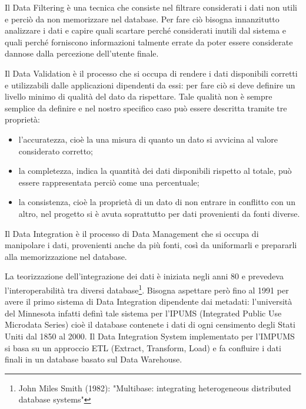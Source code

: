 \documentclass[12pt]{report}
\begin{document}
Il Data Filtering è una tecnica che consiste nel filtrare considerati i dati non utili e perciò da non memorizzare nel database.
Per fare ciò bisogna innanzitutto analizzare i dati e capire quali scartare perché considerati inutili dal sistema e quali perché forniscono informazioni talmente errate da poter essere considerate dannose dalla percezione dell'utente finale.

Il Data Validation è il processo che si occupa di rendere i dati disponibili corretti e utilizzabili dalle applicazioni dipendenti da essi: per fare ciò si deve definire un livello minimo di qualità del dato da rispettare. 
Tale qualità non è sempre semplice da definire e nel nostro specifico caso può essere descritta tramite tre proprietà:
\begin{itemize}
\item l'accuratezza, cioè la una misura di quanto un dato si avvicina al valore considerato corretto;
\item la completezza, indica la quantità dei dati disponibili rispetto al totale, può essere rappresentata perciò come una percentuale;
\item la consistenza, cioè la proprietà di un dato di non entrare in conflitto con un altro, nel progetto si è avuta soprattutto per dati provenienti da fonti diverse.
\end{itemize}

Il Data Integration è il processo di Data Management che si occupa di manipolare i dati, provenienti anche da più fonti, così da uniformarli e prepararli alla memorizzazione nel database.

La teorizzazione dell'integrazione dei dati è iniziata negli anni 80 e prevedeva l'interoperabilità tra diversi database\footnote{John Miles Smith (1982): "Multibase: integrating heterogeneous distributed database systems"}.
Bisogna aspettare però fino al 1991 per avere il primo sistema di Data Integration dipendente dai metadati: l'università del Minnesota infatti definì tale sistema per l'IPUMS (Integrated Public Use Microdata Series) cioè il database contenete i dati di ogni censimento degli Stati Uniti dal 1850 al 2000. 
Il Data Integration System implementato per l'IMPUMS si basa su un approccio ETL (Extract, Transform, Load) e fa confluire i dati finali in un database basato sul Data Warehouse.
\end{document}
